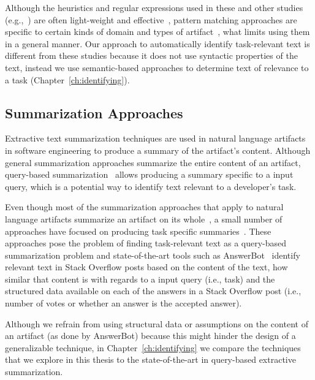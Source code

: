 Although the heuristics and regular expressions used in these and other studies (e.g.,~\cite{nadi2020})
are often light-weight and effective~\cite{Bavota2016, Maalej2013}, 
pattern matching approaches are specific to certain kinds of domain and 
types of artifact~\cite{fucci2019}, what limits
using them in a general manner. 
Our approach to automatically identify task-relevant text 
is different from these studies because it does not use syntactic properties of the text, 
instead we use semantic-based approaches to determine text of relevance to a task (Chapter~\ref{ch:identifying}).





\subsection{Summarization Approaches}
\label{cp2:summarization}



Extractive text summarization techniques are used in natural language artifacts in software engineering to
produce a summary of the artifact's content. 
Although general summarization approaches summarize the entire content of an artifact, 
query-based summarization~\cite{Goldsteinet1999} allows 
producing a summary specific to a input query, which is a potential way to identify 
text relevant to a developer's task. 


Even though most of the summarization approaches that apply to natural language artifacts 
summarize an artifact on its whole~\cite{Rastkar2010, Murray2008, Lotufo2012, Ponzanelli2015},
a small number of approaches have focused on
producing task specific summaries~\cite{Xu2017, silva2019}.
These approaches pose the problem of finding task-relevant text 
as a query-based summarization problem and
state-of-the-art tools such as AnswerBot~\cite{Xu2017}
identify relevant text in Stack Overflow posts 
based on 
the content of the text, how similar that content is with regards to a input query (i.e., task)
and the structured data available on each of the answers in a Stack Overflow post 
(i.e., number of votes or whether an answer is the accepted answer).



Although we refrain from using structural data 
or assumptions on the content of an artifact (as done by AnswerBot)
because this might hinder the design of a
generalizable technique, in 
Chapter~\ref{ch:identifying} 
we compare the techniques that we explore in this thesis
 to  the state-of-the-art
 in query-based extractive summarization. 



